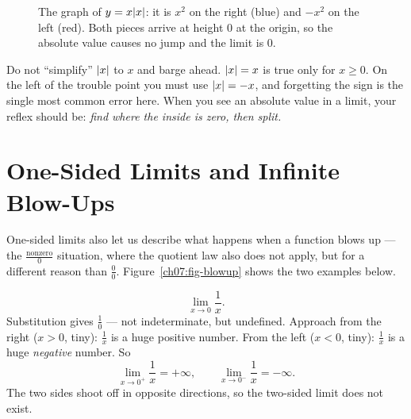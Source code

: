 \begin{figure}[htbp]
\centering
{}
\caption{The graph of $y=x\lvert x\rvert$: it is $x^{2}$ on the right (blue) and
$-x^{2}$ on the left (red). Both pieces arrive at height $0$ at the origin, so
the absolute value causes no jump and the limit is $0$.}
\label{ch07:fig-xabsx}
\end{figure}

\begin{trapbox}
Do not ``simplify'' $\lvert x\rvert$ to $x$ and barge ahead. $\lvert x\rvert = x$ is true
only for $x\ge 0$. On the left of the trouble point you must use $\lvert x\rvert=-x$,
and forgetting the sign is the single most common error here. When you see an
absolute value in a limit, your reflex should be: \emph{find where the inside
is zero, then split.}
\end{trapbox}

\section{One-Sided Limits and Infinite Blow-Ups}
\label{ch07:infinite}

One-sided limits also let us describe what happens when a function blows up ---
the $\frac{\text{nonzero}}{0}$ situation, where the quotient law also does not
apply, but for a different reason than $\frac00$. Figure~\ref{ch07:fig-blowup}
shows the two examples below.

\begin{example}
\label{ch07:ex-blowup}
\[
  \lim_{x\to 0}\frac{1}{x}.
\]
Substitution gives $\frac{1}{0}$ --- not indeterminate, but undefined.
Approach from the right ($x>0$, tiny): $\frac1x$ is a huge positive number.
From the left ($x<0$, tiny): $\frac1x$ is a huge \emph{negative} number. So
\[
  \lim_{x\to 0^{+}}\frac1x = +\infty,
  \qquad
  \lim_{x\to 0^{-}}\frac1x = -\infty.
\]
The two sides shoot off in
opposite directions, so the two-sided limit does not exist.
\end{example}

